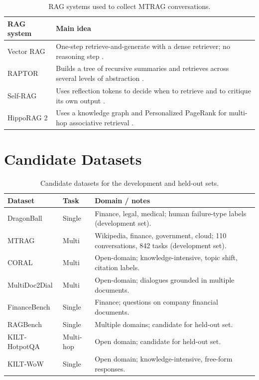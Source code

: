 \documentclass[11pt]{article}
\begin{document}
\begin{table}[H]
\centering\small
\begin{tabularx}{\columnwidth}{@{}l L@{}}
\toprule
\textbf{RAG system} & \textbf{Main idea} \\
\midrule
Vector RAG & One-step retrieve-and-generate with a dense retriever; no reasoning step \citep{lewis2020rag}. \\
RAPTOR & Builds a tree of recursive summaries and retrieves across several levels of abstraction \citep{sarthi2024raptor}. \\
Self-RAG & Uses reflection tokens to decide when to retrieve and to critique its own output \citep{asai2024selfrag}. \\
HippoRAG 2 & Uses a knowledge graph and Personalized PageRank for multi-hop associative retrieval \citep{gutierrez2025hipporag2}. \\
\bottomrule
\end{tabularx}
\caption{RAG systems used to collect MTRAG conversations.}
\end{table}

\section{Candidate Datasets}
\label{app:datasets}

\begin{table}[H]
\centering\small
\begin{tabularx}{\columnwidth}{@{}l l L@{}}
\toprule
\textbf{Dataset} & \textbf{Task} & \textbf{Domain / notes} \\
\midrule
DragonBall & Single & Finance, legal, medical; human failure-type labels (development set). \\
MTRAG & Multi & Wikipedia, finance, government, cloud; 110 conversations, 842 tasks (development set). \\
CORAL & Multi & Open-domain; knowledge-intensive, topic shift, citation labels. \\
MultiDoc2Dial & Multi & Open-domain; dialogues grounded in multiple documents. \\
FinanceBench & Single & Finance; questions on company financial documents. \\
RAGBench & Single & Multiple domains; candidate for held-out set. \\
KILT-HotpotQA & Multi-hop & Open domain; candidate for held-out set. \\
KILT-WoW & Single & Open domain; knowledge-intensive, free-form responses. \\
\bottomrule
\end{tabularx}
\caption{Candidate datasets for the development and held-out sets.}
\end{table}
\end{document}
